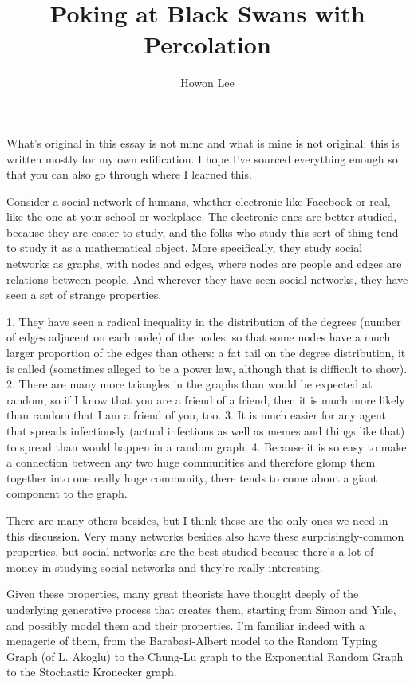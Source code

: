\documentclass[12pt]{article}
\begin{document}
\title{Poking at Black Swans with Percolation}
\author{Howon Lee}
\maketitle

What's original in this essay is not mine and what is mine is not original: this is written mostly for my own edification. I hope I've sourced everything enough so that you can also go through where I learned this.

Consider a social network of humans, whether electronic like Facebook or real, like the one at your school or workplace. The electronic ones are better studied, because they are easier to study, and the folks who study this sort of thing tend to study it as a mathematical object. More specifically, they study social networks as graphs, with nodes and edges, where nodes are people and edges are relations between people. And wherever they have seen social networks, they have seen a set of strange properties. 

1. They have seen a radical inequality in the distribution of the degrees (number of edges adjacent on each node) of the nodes, so that some nodes have a much larger proportion of the edges than others: a fat tail on the degree distribution, it is called (sometimes alleged to be a power law, although that is difficult to show).
2. There are many more triangles in the graphs than would be expected at random, so if I know that you are a friend of a friend, then it is much more likely than random that I am a friend of you, too.
3. It is much easier for any agent that spreads infectiously (actual infections as well as memes and things like that) to spread than would happen in a random graph.
4. Because it is so easy to make a connection between any two huge communities and therefore glomp them together into one really huge community, there tends to come about a giant component to the graph.

There are many others besides, but I think these are the only ones we need in this discussion. Very many networks besides also have these surprisingly-common properties, but social networks are the best studied because there's a lot of money in studying social networks and they're really interesting.

Given these properties, many great theorists have thought deeply of the underlying generative process that creates them, starting from Simon and Yule, and possibly model them and their properties. I'm familiar indeed with a menagerie of them, from the Barabasi-Albert model to the Random Typing Graph (of L. Akoglu) to the Chung-Lu graph to the Exponential Random Graph to the Stochastic Kronecker graph.
\end{document}
